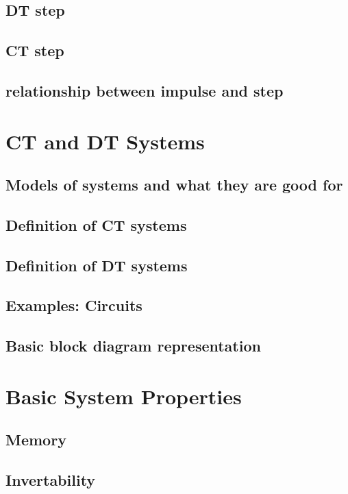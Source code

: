 \documentclass{article}
\begin{document}
\subsection{DT step}
\label{sec:org0ecc466}
\subsection{CT step}
\label{sec:org4d099d0}
\subsection{relationship between impulse and step}
\label{sec:org055e977}
\section{CT and DT Systems}
\label{sec:org7f962be}
\subsection{Models of systems and what they are good for}
\label{sec:org630c08b}
\subsection{Definition of CT systems}
\label{sec:org4c0c08a}
\subsection{Definition of DT systems}
\label{sec:org93604c1}
\subsection{Examples: Circuits}
\label{sec:org787bf61}
\subsection{Basic block diagram representation}
\label{sec:orgb2e3c34}
\section{Basic System Properties}
\label{sec:org4a5eb76}
\subsection{Memory}
\label{sec:org11a1ea9}
\subsection{Invertability}
\label{sec:org73bcf64}
\end{document}
